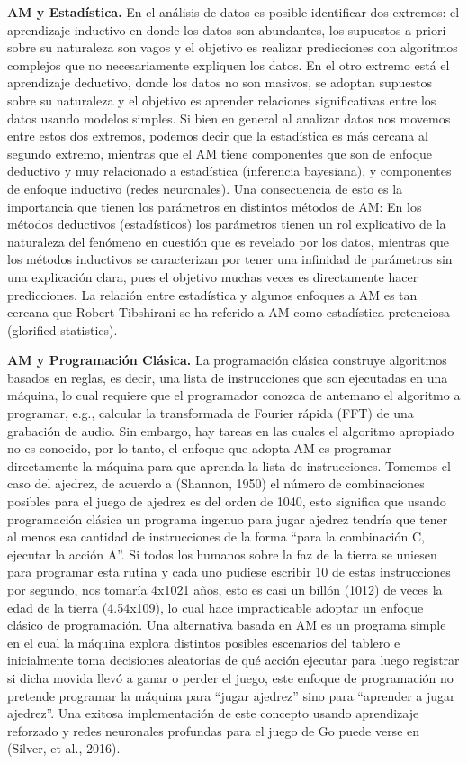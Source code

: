\textbf{AM y Estadística.} En el análisis de datos es posible identificar dos extremos: el aprendizaje inductivo en donde los datos son abundantes, los supuestos a priori sobre su naturaleza son vagos y el objetivo es realizar predicciones con algoritmos complejos que no necesariamente expliquen los datos. En el otro extremo está el aprendizaje deductivo, donde los datos no son masivos, se adoptan supuestos sobre su naturaleza y el objetivo es aprender relaciones significativas entre los datos usando modelos simples. Si bien en general al analizar datos nos movemos entre estos dos extremos, podemos decir que la estadística es más cercana al segundo extremo, mientras que el AM tiene componentes que son de enfoque deductivo y muy relacionado a estadística (inferencia bayesiana), y componentes de enfoque inductivo (redes neuronales). Una consecuencia de esto es la importancia que tienen los parámetros en distintos métodos de AM: En los métodos deductivos (estadísticos) los parámetros tienen un rol explicativo de la naturaleza del fenómeno en cuestión que es revelado por los datos, mientras que los métodos inductivos se caracterizan por tener una infinidad de parámetros sin una explicación clara, pues el objetivo muchas veces es directamente hacer predicciones. La relación entre estadística y algunos enfoques a AM es tan cercana que Robert Tibshirani se ha referido a AM como estadística pretenciosa (glorified statistics).

\textbf{AM y Programación Clásica.} La programación clásica construye algoritmos basados en reglas, es decir, una lista de instrucciones que son ejecutadas en una máquina, lo cual requiere que el programador conozca de antemano el algoritmo a programar, e.g., calcular la transformada de Fourier rápida (FFT) de una grabación de audio. Sin embargo, hay tareas en las cuales el algoritmo apropiado no es conocido, por lo tanto, el enfoque que adopta AM es programar directamente la máquina para que aprenda la lista de instrucciones. Tomemos el caso del ajedrez, de acuerdo a (Shannon, 1950) el número de combinaciones posibles para el juego de ajedrez es del orden de 1040, esto significa que usando programación clásica un programa ingenuo para jugar ajedrez tendría que tener al menos esa cantidad de instrucciones de la forma “para la combinación C, ejecutar la acción A”. Si todos los humanos sobre la faz de la tierra se uniesen para programar esta rutina y cada uno pudiese escribir 10 de estas instrucciones por segundo, nos tomaría 4x1021 años, esto es casi un billón (1012) de veces la edad de la tierra (4.54x109), lo cual hace impracticable adoptar un enfoque clásico de programación. Una alternativa basada en AM es un programa simple en el cual la máquina explora distintos posibles escenarios del tablero e inicialmente toma decisiones aleatorias de qué acción ejecutar para luego registrar si dicha movida llevó a ganar o perder el juego, este enfoque de programación no pretende programar la máquina para “jugar ajedrez” sino para “aprender a jugar ajedrez”. Una exitosa implementación de este concepto usando aprendizaje reforzado y redes neuronales profundas para el juego de Go puede verse en (Silver, et al., 2016).


